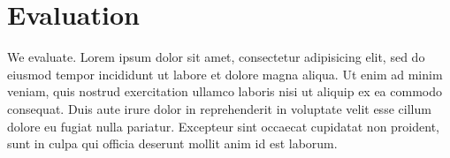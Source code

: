\section{Evaluation}
\label{sec:eval}

We evaluate. Lorem ipsum dolor sit amet, consectetur adipisicing elit,
sed do eiusmod tempor incididunt ut labore et dolore magna aliqua. Ut
enim ad minim veniam, quis nostrud exercitation ullamco laboris nisi
ut aliquip ex ea commodo consequat. Duis aute irure dolor in
reprehenderit in voluptate velit esse cillum dolore eu fugiat nulla
pariatur. Excepteur sint occaecat cupidatat non proident, sunt in
culpa qui officia deserunt mollit anim id est laborum.
